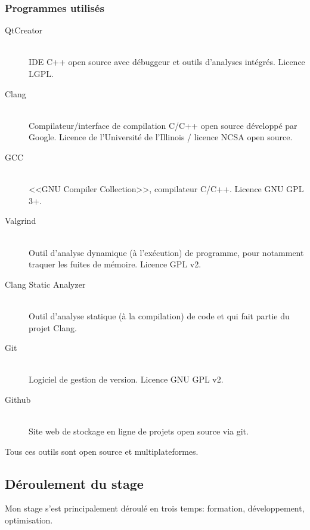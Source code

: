 \documentclass[a4paper,french,12pt]{article}
\begin{document}
		
		
		\subsubsection{Programmes utilisés}
		  \begin{description}
		   \item [QtCreator]~\\
		      IDE C++ open source avec débuggeur et outils d'analyses intégrés.
		      Licence LGPL.
		   
		   \item [Clang]~\\
		      Compilateur/interface de compilation C/C++ open source développé par Google.
		      Licence de l'Université de l'Illinois / licence  NCSA open source.
		   
		   \item [GCC]~\\
		      <<GNU Compiler Collection>>, compilateur C/C++.
		      Licence GNU GPL 3+.
		    
		   \item [Valgrind]~\\
		      Outil d'analyse dynamique (à l'exécution) de programme, pour notamment traquer les fuites de mémoire.
		      Licence GPL v2.
		   
		   \item [Clang Static Analyzer]~\\
		      Outil d'analyse statique (à la compilation) de code et qui fait partie du projet Clang.
		      
		   \item [Git]~\\
		      Logiciel de gestion de version.
		      Licence GNU GPL v2.
		      
		   \item [Github]~\\
		      Site web de stockage en ligne de projets open source via git.
		   
		  \end{description}

		Tous ces outils sont open source et multiplateformes.
		
	\subsection{Déroulement du stage}
	
		Mon stage s'est principalement déroulé en trois temps: formation, développement, optimisation.
		
\end{document}
